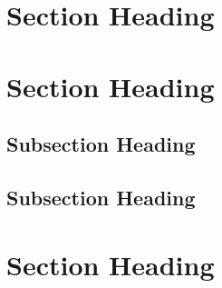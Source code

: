\documentclass{aaltoseries}
\begin{document}
\section{Section Heading}
\lipsum[1-4]
\section{Section Heading}
\lipsum[5-6]
\subsection{Subsection Heading}
\lipsum[7-8]
\subsection{Subsection Heading}
\lipsum[9-10]
\section{Section Heading}
\lipsum[11-12]
\end{document}
